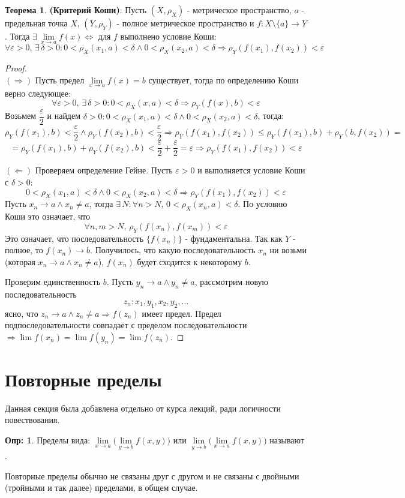 \documentclass[12pt]{article}
\newcommand{\VE}{\varepsilon}
\theoremstyle{definition}
\newtheorem{defn}{Опр:}
\newtheorem{theorem}{Теорема}
\begin{document}
\begin{theorem}
	\textbf{(Критерий Коши)}: Пусть $(X,\rho_X)$ - метрическое пространство, $a$ - предельная точка $X$, $(Y,\rho_Y)$ - полное метрическое пространство и $f \colon X \setminus \{a\} \to Y$. Тогда $\exists \, \lim\limits_{x \to a}f(x) \Leftrightarrow$ для $f$ выполнено условие Коши:
	$$
		\forall \VE > 0, \, \exists \, \delta > 0 \colon 0 < \rho_X(x_1,a) < \delta \wedge  0 < \rho_X(x_2,a) < \delta \Rightarrow \rho_Y(f(x_1), f(x_2)) < \VE
	$$
\end{theorem}
\begin{proof}\hfill\\
	$(\Rightarrow)$ Пусть предел $\lim\limits_{x \to a}f(x) = b$ существует, тогда по определению Коши верно следующее:
	$$
		\forall \VE>0, \, \exists\, \delta > 0 \colon 0 < \rho_X(x,a) < \delta \Rightarrow \rho_Y(f(x), b) < \VE
	$$ 
	Возьмем $\dfrac{\VE}{2}$ и найдем $\delta > 0 \colon 0 < \rho_X(x_1,a) < \delta \wedge  0 < \rho_X(x_2,a) < \delta$, тогда:
	$$
		\rho_Y(f(x_1), b) < \dfrac{\VE}{2} \wedge \rho_Y(f(x_2), b) < \dfrac{\VE}{2} \Rightarrow \rho_Y(f(x_1),f(x_2)) \leq \rho_Y(f(x_1), b) + \rho_Y(b,f(x_2)) =
	$$
	$$
	 	= \rho_Y(f(x_1), b) + \rho_Y(f(x_2),b) < \dfrac{\VE}{2} + \dfrac{\VE}{2} = \VE \Rightarrow \rho_Y(f(x_1),f(x_2)) < \VE
	$$ 	
	
	$(\Leftarrow)$ Проверяем определение Гейне. Пусть $\VE > 0$ и выполняется условие Коши  с $\delta > 0$:
	$$
		0 < \rho_X(x_1,a) < \delta \wedge 0 <  \rho_X(x_2,a) < \delta \Rightarrow \rho_Y(f(x_1), f(x_2)) < \VE
	$$
	Пусть $x_n \to a \wedge x_n \neq a$, тогда $\exists \, N \colon \forall n > N, \, 0 < \rho_X(x_n,a) < \delta$. По условию Коши это означает, что 
	$$
		\forall n,m > N, \, \rho_Y(f(x_n),f(x_m)) < \VE
	$$ 
	Это означает, что последовательность $\{f(x_n)\}$ - фундаментальна. Так как $Y$ - полное, то $f(x_n) \to b$. Получилось, что какую последовательность $x_n$ ни возьми (которая $x_n \to a \wedge x_n \neq a$), $f(x_n)$ будет сходится к некоторому $b$. 
	
	Проверим единственность $b$. Пусть $y_n \to a \wedge y_n \neq a$, рассмотрим новую последовательность 
	$$
		z_n \colon x_1, y_1, x_2, y_2, \dotsc
	$$
	ясно, что $z_n \to a\wedge z_n \neq a \Rightarrow f(z_n)$ имеет предел. Предел подпоследовательности совпадает с пределом последовательности $\Rightarrow \lim f(x_n) = \lim f(y_n) = \lim f(z_n)$.
\end{proof}
\newpage
\section*{Повторные пределы}
Данная секция была добавлена отдельно от курса лекций, ради логичности повествования.
\begin{defn}
	Пределы вида: $\lim\limits_{x \to a}\Big(\lim\limits_{y\to b} f(x,y)\Big)$ или $\lim\limits_{y \to b}\Big(\lim\limits_{x\to a} f(x,y)\Big)$ называют .
\end{defn}
Повторные пределы обычно не связаны друг с другом и не связаны с двойными (тройными и так далее) пределами, в общем случае.
\end{document}
